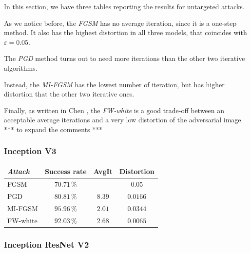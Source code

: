 \documentclass[10pt,twocolumn,letterpaper, english]{article}
\theoremstyle{definition}
\theoremstyle{plain}
\theoremstyle{plain}
\theoremstyle{plain}
\theoremstyle{plain}
\theoremstyle{remark}
\theoremstyle{remark}
\theoremstyle{definition}
\theoremstyle{definition}
\theoremstyle{definition}
\theoremstyle{definition}
\renewcommand{\epsilon}{\varepsilon}
\begin{document}

In this section, we have three tables reporting the results for untargeted attacks. 

As we notice before, the \textit{FGSM} has no average iteration, since it is a one-step method. 
It also has the highest distortion in all three models, that coincides with $\epsilon = 0.05$. 

The \textit{PGD} method turns out to need more iterations than the other two iterative algorithms. 

Instead, the \textit{MI-FGSM} has the lowest number of iteration, but has higher distortion that the other two iterative ones. 

Finally, as written in Chen \cite{frank}, the \textit{FW-white} is a good trade-off between an acceptable average iterations and a very low distortion of the adversarial image. \\

*** to expand the comments *** 

\subsubsection{Inception V3}

\begin{center}

\begin{tabular}{ |l|c|c|c| }
 \hline
  \textit{Attack} & Success rate & AvgIt & Distortion \\
 \hline
 
 FGSM   & $70.71\,\%$   &  - & $0.05$\\
 PGD&   $80.81\,\%$  & $8.39$  & $0.0166$ \\
 MI-FGSM & $95.96\,\%$ & $2.01$ & $0.0344$\\
 FW-white & $92.03\,\%$ & $2.68$ & $0.0065$\\
\hline
\end{tabular}
\end{center}


\subsubsection{Inception ResNet V2}
\end{document}
